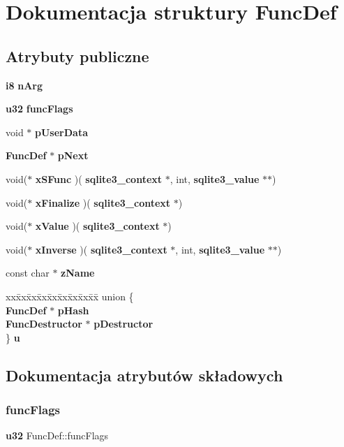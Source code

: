 \section{Dokumentacja struktury Func\+Def}
\label{struct_func_def}
\subsection*{Atrybuty publiczne}
\begin{DoxyCompactItemize}
\item 
\textbf{ i8} \textbf{ n\+Arg}
\item 
\textbf{ u32} \textbf{ func\+Flags}
\item 
void $\ast$ \textbf{ p\+User\+Data}
\item 
\textbf{ Func\+Def} $\ast$ \textbf{ p\+Next}
\item 
void($\ast$ \textbf{ x\+S\+Func} )(\textbf{ sqlite3\+\_\+context} $\ast$, int, \textbf{ sqlite3\+\_\+value} $\ast$$\ast$)
\item 
void($\ast$ \textbf{ x\+Finalize} )(\textbf{ sqlite3\+\_\+context} $\ast$)
\item 
void($\ast$ \textbf{ x\+Value} )(\textbf{ sqlite3\+\_\+context} $\ast$)
\item 
void($\ast$ \textbf{ x\+Inverse} )(\textbf{ sqlite3\+\_\+context} $\ast$, int, \textbf{ sqlite3\+\_\+value} $\ast$$\ast$)
\item 
const char $\ast$ \textbf{ z\+Name}
\item 
\begin{tabbing}
xx\=xx\=xx\=xx\=xx\=xx\=xx\=xx\=xx\=\kill
union \{\\
\>\textbf{ FuncDef} $\ast$ \textbf{ pHash}\\
\>\textbf{ FuncDestructor} $\ast$ \textbf{ pDestructor}\\
\} \textbf{ u}\\

\end{tabbing}\end{DoxyCompactItemize}


\subsection{Dokumentacja atrybutów składowych}
\mbox{\label{struct_func_def_a7f8a4391d6fbe77526ff5c513e5d1df8}} 
\subsubsection{funcFlags}
{\footnotesize\ttfamily \textbf{ u32} Func\+Def\+::func\+Flags}

